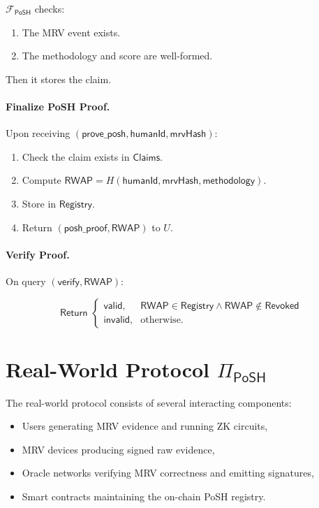 \documentclass[11pt,a4paper]{report}
\theoremstyle{definition}
\theoremstyle{remark}
\begin{document}
$\mathcal{F}_{\textsf{PoSH}}$ checks:

\begin{enumerate}[leftmargin=*]
  \item The MRV event exists.
  \item The methodology and score are well-formed.
\end{enumerate}

Then it stores the claim.

\paragraph{Finalize PoSH Proof.}

Upon receiving $(\textsf{prove\_posh}, \mathsf{humanId}, \mathsf{mrvHash})$:

\begin{enumerate}[leftmargin=*]
  \item Check the claim exists in $\mathsf{Claims}$.
  \item Compute $\mathsf{RWAP} = H(\mathsf{humanId}, \mathsf{mrvHash}, \mathsf{methodology})$.
  \item Store in $\mathsf{Registry}$.
  \item Return $(\textsf{posh\_proof}, \mathsf{RWAP})$ to $U$.
\end{enumerate}

\paragraph{Verify Proof.}

On query $(\textsf{verify}, \mathsf{RWAP})$:

\[
  \textsf{Return } 
  \begin{cases}
  \textsf{valid}, & \mathsf{RWAP} \in \mathsf{Registry} \land \mathsf{RWAP} \notin \mathsf{Revoked} \\
  \textsf{invalid}, & \text{otherwise.}
  \end{cases}
\]

\section{Real-World Protocol \texorpdfstring{$\Pi_{\textsf{PoSH}}$}{Pi-PoSH}}

The real-world protocol consists of several interacting components:

\begin{itemize}[leftmargin=*]
  \item Users generating MRV evidence and running ZK circuits,
  \item MRV devices producing signed raw evidence,
  \item Oracle networks verifying MRV correctness and emitting signatures,
  \item Smart contracts maintaining the on-chain PoSH registry.
\end{itemize}
\end{document}
